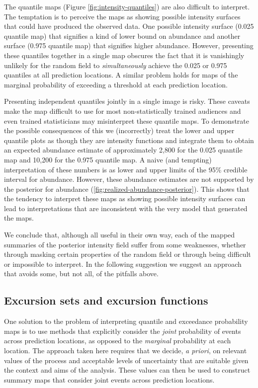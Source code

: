\documentclass{stylefile16/statsoc}
\begin{document}
The quantile maps (Figure \ref{fig:intensity-quantiles}) are also difficult to interpret. The temptation is to perceive the maps as showing possible intensity surfaces that could have produced the observed data. One possible intensity surface (0.025 quantile map) that signifies a kind of lower bound on abundance and another surface (0.975 quantile map) that signifies higher abundance.  However, presenting these quantiles together in a single map obscures the fact that it is vanishingly unlikely for the random field to \textit{simultaneously} achieve the 0.025 or 0.975 quantiles at all prediction locations.  A similar problem holds for maps of the marginal probability of exceeding a threshold at each prediction location.  

Presenting independent quantiles jointly in a single image is risky.  These caveats make the map difficult to use for most non-statistically trained audiences and even trained statisticians may misinterpret these quantile maps.  To demonstrate the possible consequences of this we (incorrectly) treat the lower and upper quantile plots as though they are intensity functions and integrate them to obtain an expected abundance estimate of approximately 2,800 for the 0.025 quantile map and 10,200 for the 0.975 quantile map.  A naive (and tempting) interpretation of these numbers is as lower and upper limits of the 95\% credible interval for abundance. However, these abundance estimates are not supported by the posterior for abundance (\autoref{fig:realized-abundance-posterior}).  This shows that the tendency to interpret these maps as showing possible intensity surfaces can lead to interpretations that are inconsistent with the very model that generated the maps.

We conclude that, although all useful in their own way, each of the mapped summaries of the posterior intensity field suffer from some weaknesses, whether through masking certain properties of the random field or through being difficult or impossible to interpret. In the following suggestion we suggest an approach that avoids some, but not all, of the pitfalls above.

\subsection{Excursion sets and excursion functions}

One solution to the problem of interpreting quantile and exceedance probability maps is to use methods that explicitly consider the \textit{joint} probability of events across prediction locations, as opposed to the \textit{marginal} probability at each location. The approach taken here requires that we decide, \emph{a priori}, on relevant values of the process and acceptable levels of uncertainty that are suitable given the context and aims of the analysis.  These values can then be used to construct summary maps that consider joint events across prediction locations.  
\end{document}
